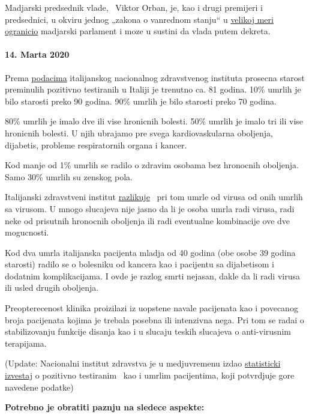 Madjarski predsednik vlade, ~Viktor Orban, je, kao i drugi premijeri i
predsednici, u okviru jednog „zakona o vanrednom stanju`` u
\href{https://www.krone.at/2127086}{velikoj meri ogranicio} madjarski
parlament i moze u sustini da vlada putem dekreta.

\hypertarget{14-marta-2020}{%
\paragraph{14. Marta 2020}\label{14-marta-2020}}

Prema
\href{https://www.epicentro.iss.it/coronavirus/sars-cov-2-decessi-italia}{podacima}
italijanskog nacionalnog zdravstvenog instituta prosecna starost
preminulih pozitivno testiranih u Italiji je trenutno ca. 81 godina.
10\% umrlih je bilo starosti preko 90 godina. 90\% umrlih je bilo
starosti preko 70 godina.

80\% umrlih je imalo dve ili vise hronicnih bolesti. 50\% umrlih je
imalo tri ili vise hronicnih bolesti. U njih ubrajamo pre svega
kardiovaskularna oboljenja, dijabetis, probleme respiratornih organa i
kancer.

Kod manje od 1\% umrlih se radilo o zdravim osobama bez hronocnih
oboljenja. Samo 30\% umrlih su zenskog pola.

Italijanski zdravstveni institut
\href{https://www.youtube.com/watch?v=0M4kbPDHGR0\&feature=youtu.be\&t=210}{razlikuje}
~pri tom umrle od virusa od onih umrlih sa virusom. U mnogo slucajeva
nije jasno da li je osoba umrla radi virusa, radi neke od prisutnih
hronocnih oboljenja ili radi eventualne kombinacije ove dve mogucnosti.

Kod dva umrla italijanska pacijenta mladja od 40 godina (obe osobe 39
godina starosti) radilo se o bolesniku od kancera kao i pacijentu sa
dijabetisom i dodatnim komplikacijama. I ovde je razlog smrti nejasan,
dakle da li radi virusa ili usled drugih oboljenja.

Preopterecenost klinika proizilazi iz uopstene navale pacijenata kao i
povecanog broja pacijenata kojima je trebala posebna ili intenzivna
nega. Pri tom se radai o stabilizovanju funkcije disanja kao i u slucaju
teskih slucajeva o anti-virusnim terapijama.

(Update: Nacionalni institut zdravstva je u medjuvremenu izdao
\href{https://www.epicentro.iss.it/coronavirus/bollettino/Report-COVID-20}{statisticki
izvestaj} o pozitivno testiranim~ kao i umrlim pacijentima, koji
potvrdjuje gore navedene podatke)

\textbf{Potrebno je obratiti paznju na sledece aspekte:}


